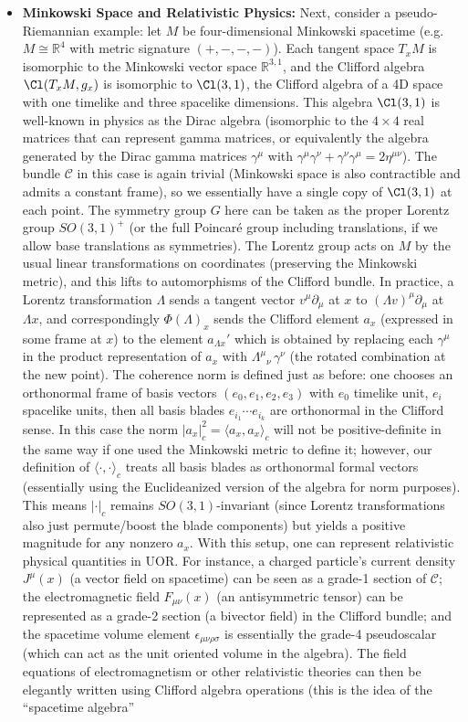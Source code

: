 \documentclass[12pt]{article}
\begin{document}
\begin{itemize}
    \item \textbf{Minkowski Space and Relativistic Physics:} Next, consider a pseudo-Riemannian example: let $M$ be four-dimensional Minkowski spacetime (e.g. $M \cong \mathbb{R}^4$ with metric signature $(+,-,-,-)$). Each tangent space $T_x M$ is isomorphic to the Minkowski vector space $\mathbb{R}^{3,1}$, and the Clifford algebra $\Cl(T_xM, g_x)$ is isomorphic to $\Cl(3,1)$, the Clifford algebra of a 4D space with one timelike and three spacelike dimensions. This algebra $\Cl(3,1)$ is well-known in physics as the Dirac algebra (isomorphic to the $4\times4$ real matrices that can represent gamma matrices, or equivalently the algebra generated by the Dirac gamma matrices $\gamma^\mu$ with $\gamma^\mu \gamma^\nu + \gamma^\nu \gamma^\mu = 2\eta^{\mu\nu}$). The bundle $\mathcal{C}$ in this case is again trivial (Minkowski space is also contractible and admits a constant frame), so we essentially have a single copy of $\Cl(3,1)$ at each point. The symmetry group $G$ here can be taken as the proper Lorentz group $SO(3,1)^+$ (or the full Poincaré group including translations, if we allow base translations as symmetries). The Lorentz group acts on $M$ by the usual linear transformations on coordinates (preserving the Minkowski metric), and this lifts to automorphisms of the Clifford bundle. In practice, a Lorentz transformation $\Lambda$ sends a tangent vector $v^\mu \partial_\mu$ at $x$ to $(\Lambda v)^\mu \partial_\mu$ at $\Lambda x$, and correspondingly $\Phi(\Lambda)_x$ sends the Clifford element $a_x$ (expressed in some frame at $x$) to the element $a_{\Lambda x}'$ which is obtained by replacing each $\gamma^\mu$ in the product representation of $a_x$ with $\Lambda^\mu{}_{\nu}\, \gamma^\nu$ (the rotated combination at the new point). The coherence norm is defined just as before: one chooses an orthonormal frame of basis vectors $(e_0,e_1,e_2,e_3)$ with $e_0$ timelike unit, $e_i$ spacelike units, then all basis blades $e_{i_1}\cdots e_{i_k}$ are orthonormal in the Clifford sense. In this case the norm $|a_x|_c^2 = \langle a_x, a_x\rangle_c$ will not be positive-definite in the same way if one used the Minkowski metric to define it; however, our definition of $\langle\cdot,\cdot\rangle_c$ treats all basis blades as orthonormal formal vectors (essentially using the Euclideanized version of the algebra for norm purposes). This means $|\cdot|_c$ remains $SO(3,1)$-invariant (since Lorentz transformations also just permute/boost the blade components) but yields a positive magnitude for any nonzero $a_x$. With this setup, one can represent relativistic physical quantities in UOR. For instance, a charged particle’s current density $J^\mu(x)$ (a vector field on spacetime) can be seen as a grade-1 section of $\mathcal{C}$; the electromagnetic field $F_{\mu\nu}(x)$ (an antisymmetric tensor) can be represented as a grade-2 section (a bivector field) in the Clifford bundle; and the spacetime volume element $\epsilon_{\mu\nu\rho\sigma}$ is essentially the grade-4 pseudoscalar (which can act as the unit oriented volume in the algebra). The field equations of electromagnetism or other relativistic theories can then be elegantly written using Clifford algebra operations (this is the idea of the “spacetime algebra” 
\end{itemize}
\end{document}

